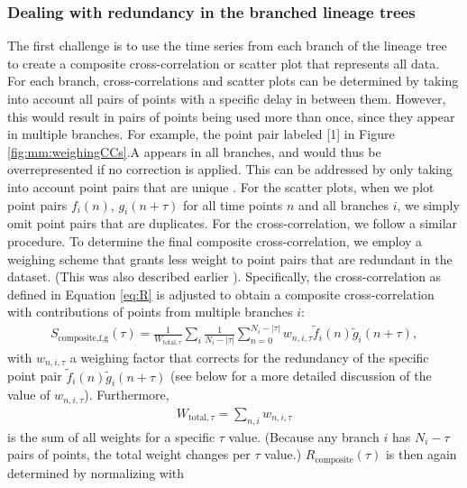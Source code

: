 {\subsubsection{Dealing with redundancy in the branched lineage trees}

The first challenge is to use the time series from each branch of the lineage tree
to
create a composite cross-correlation or scatter plot that represents all data.
%
For each branch, cross-correlations and scatter plots can be determined by taking into account all pairs of points with a specific delay in between them.
However, this would result in pairs of points being used more than once, 
since they appear in multiple branches.
For example, the point pair labeled [1] in Figure \ref{fig:mm:weighingCCs}.A appears in all branches, and would thus be overrepresented if no correction is applied.
%
This can be addressed by only taking into account point pairs that are unique \cite{Dunlop2008}.
%
For the scatter plots, 
when we plot point pairs
$f_i(n)$, $g_i(n+\tau)$ for all time points $n$ and all branches $i$, 
we simply omit point pairs that are duplicates.
%
For the cross-correlation, we follow a similar procedure.
To determine the final composite cross-correlation, we 
employ a weighing scheme that grants less weight to point pairs that are redundant in the dataset.
(This was also described earlier \cite{Kiviet2010,Walker2016t,Dunlop2008}).
% 
Specifically, %
 the cross-correlation as defined in Equation \ref{eq:R} is adjusted to obtain a composite cross-correlation with contributions of points from multiple branches $i$:
\begin{align}
	\label{eq:Rcomposite}
	S_\text{composite,f,g}(\tau) = 
	\frac{1}{  W_{\text{total},\tau}  } 
	\sum_i{
		\frac{1}{  N_i-|\tau|  } 
		\sum_{n=0}^{N_i-|\tau|}{ 
			w_{n,i,\tau} \tilde{f}_i(n) \tilde{g}_i(n+\tau)
		}
	},
\end{align}
with $w_{n,i,\tau}$ a weighing factor that corrects for the redundancy of the specific point pair $\tilde{f}_i(n) \tilde{g}_i(n+\tau)$ (see below for a more detailed discussion of the value of $w_{n,i,\tau}$).
Furthermore, 
%
\begin{align*}
W_{\text{total},\tau} = \sum_{n,i} {w_{n,i,\tau}}
\end{align*}
%
is the sum of all weights for a specific $\tau$ value.
(Because any branch $i$ has $N_i-\tau$ pairs of points, the total weight changes per $\tau$ value.)
$R_\text{composite}(\tau)$ is then again determined by normalizing with
\begin{align*}

\end{align*}}
